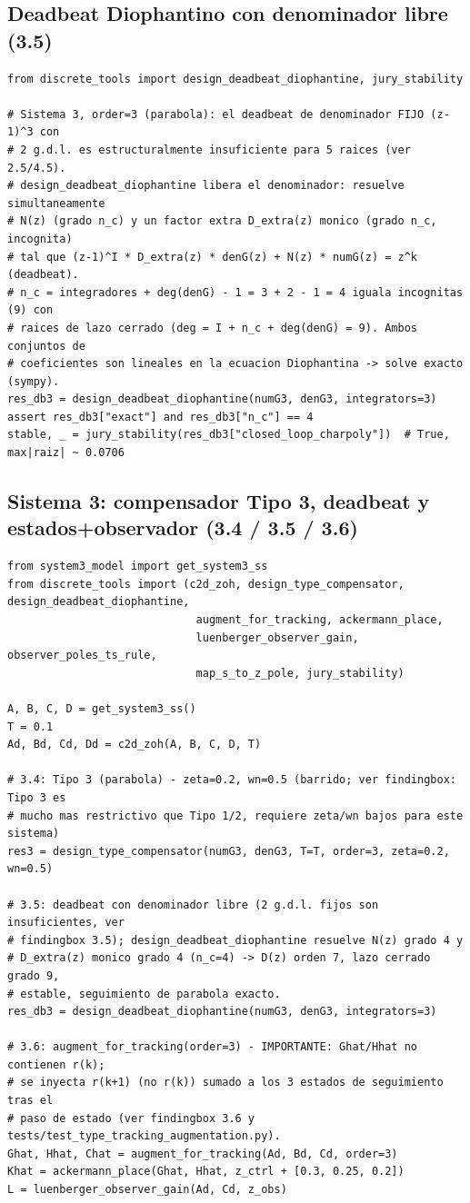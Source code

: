 \documentclass[11pt]{article}
\begin{document}
\subsection*{Deadbeat Diophantino con denominador libre (3.5)}
\begin{lstlisting}
from discrete_tools import design_deadbeat_diophantine, jury_stability

# Sistema 3, order=3 (parabola): el deadbeat de denominador FIJO (z-1)^3 con
# 2 g.d.l. es estructuralmente insuficiente para 5 raices (ver 2.5/4.5).
# design_deadbeat_diophantine libera el denominador: resuelve simultaneamente
# N(z) (grado n_c) y un factor extra D_extra(z) monico (grado n_c, incognita)
# tal que (z-1)^I * D_extra(z) * denG(z) + N(z) * numG(z) = z^k (deadbeat).
# n_c = integradores + deg(denG) - 1 = 3 + 2 - 1 = 4 iguala incognitas (9) con
# raices de lazo cerrado (deg = I + n_c + deg(denG) = 9). Ambos conjuntos de
# coeficientes son lineales en la ecuacion Diophantina -> solve exacto (sympy).
res_db3 = design_deadbeat_diophantine(numG3, denG3, integrators=3)
assert res_db3["exact"] and res_db3["n_c"] == 4
stable, _ = jury_stability(res_db3["closed_loop_charpoly"])  # True, max|raiz| ~ 0.0706
\end{lstlisting}

\subsection*{Sistema 3: compensador Tipo 3, deadbeat y estados+observador (3.4 / 3.5 / 3.6)}
\begin{lstlisting}
from system3_model import get_system3_ss
from discrete_tools import (c2d_zoh, design_type_compensator, design_deadbeat_diophantine,
                             augment_for_tracking, ackermann_place,
                             luenberger_observer_gain, observer_poles_ts_rule,
                             map_s_to_z_pole, jury_stability)

A, B, C, D = get_system3_ss()
T = 0.1
Ad, Bd, Cd, Dd = c2d_zoh(A, B, C, D, T)

# 3.4: Tipo 3 (parabola) - zeta=0.2, wn=0.5 (barrido; ver findingbox: Tipo 3 es
# mucho mas restrictivo que Tipo 1/2, requiere zeta/wn bajos para este sistema)
res3 = design_type_compensator(numG3, denG3, T=T, order=3, zeta=0.2, wn=0.5)

# 3.5: deadbeat con denominador libre (2 g.d.l. fijos son insuficientes, ver
# findingbox 3.5); design_deadbeat_diophantine resuelve N(z) grado 4 y
# D_extra(z) monico grado 4 (n_c=4) -> D(z) orden 7, lazo cerrado grado 9,
# estable, seguimiento de parabola exacto.
res_db3 = design_deadbeat_diophantine(numG3, denG3, integrators=3)

# 3.6: augment_for_tracking(order=3) - IMPORTANTE: Ghat/Hhat no contienen r(k);
# se inyecta r(k+1) (no r(k)) sumado a los 3 estados de seguimiento tras el
# paso de estado (ver findingbox 3.6 y tests/test_type_tracking_augmentation.py).
Ghat, Hhat, Chat = augment_for_tracking(Ad, Bd, Cd, order=3)
Khat = ackermann_place(Ghat, Hhat, z_ctrl + [0.3, 0.25, 0.2])
L = luenberger_observer_gain(Ad, Cd, z_obs)
\end{lstlisting}
\end{document}
